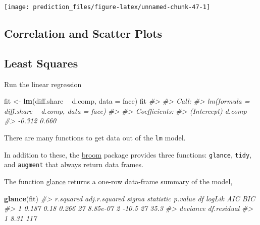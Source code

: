 \documentclass[]{book}
\newenvironment{Shaded}{\begin{snugshade}}{\end{snugshade}}
\newcommand{\KeywordTok}[1]{\textcolor[rgb]{0.13,0.29,0.53}{\textbf{#1}}}
\newcommand{\DataTypeTok}[1]{\textcolor[rgb]{0.13,0.29,0.53}{#1}}
\newcommand{\StringTok}[1]{\textcolor[rgb]{0.31,0.60,0.02}{#1}}
\newcommand{\CommentTok}[1]{\textcolor[rgb]{0.56,0.35,0.01}{\textit{#1}}}
\newcommand{\OperatorTok}[1]{\textcolor[rgb]{0.81,0.36,0.00}{\textbf{#1}}}
\newcommand{\NormalTok}[1]{#1}
\theoremstyle{definition}
\theoremstyle{definition}
\theoremstyle{definition}
\theoremstyle{remark}
\begin{document}
\begin{center}\texttt{[image: prediction\_files/figure-latex/unnamed-chunk-47-1]} \end{center}

\subsection{Correlation and Scatter
Plots}\label{correlation-and-scatter-plots}

\begin{Shaded}
\end{Shaded}

\subsection{Least Squares}\label{least-squares}

Run the linear regression

\begin{Shaded}
\begin{Highlighting}[]
\NormalTok{fit <-}\StringTok{ }\KeywordTok{lm}\NormalTok{(diff.share }\OperatorTok{~}\StringTok{ }\NormalTok{d.comp, }\DataTypeTok{data =}\NormalTok{ face)}
\NormalTok{fit}
\CommentTok{#> }
\CommentTok{#> Call:}
\CommentTok{#> lm(formula = diff.share ~ d.comp, data = face)}
\CommentTok{#> }
\CommentTok{#> Coefficients:}
\CommentTok{#> (Intercept)       d.comp  }
\CommentTok{#>      -0.312        0.660}
\end{Highlighting}
\end{Shaded}

There are many functions to get data out of the \texttt{lm} model.

In addition to these, the
\href{https://cran.r-project.org/package=broom}{broom} package provides
three functions: \texttt{glance}, \texttt{tidy}, and \texttt{augment}
that always return data frames.

The function
\href{https://www.rdocumentation.org/packages/broom/topics/glance.lm}{glance}
returns a one-row data-frame summary of the model,

\begin{Shaded}
\begin{Highlighting}[]
\KeywordTok{glance}\NormalTok{(fit)}
\CommentTok{#>   r.squared adj.r.squared sigma statistic  p.value df logLik AIC  BIC}
\CommentTok{#> 1     0.187          0.18 0.266        27 8.85e-07  2  -10.5  27 35.3}
\CommentTok{#>   deviance df.residual}
\CommentTok{#> 1     8.31         117}
\end{Highlighting}
\end{Shaded}
\end{document}
